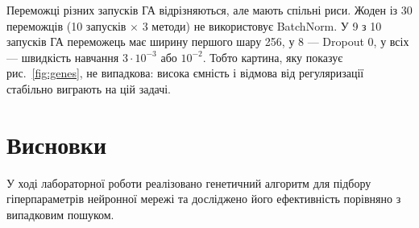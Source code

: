 \documentclass[14pt,a4paper]{extreport}
\begin{document}
Переможці різних запусків ГА відрізняються, але мають спільні риси. Жоден із 30 переможців (10 запусків $\times$ 3 методи) не використовує BatchNorm. У 9 з 10 запусків ГА переможець має ширину першого шару 256, у 8 --- Dropout 0, у всіх --- швидкість навчання $3 \cdot 10^{-3}$ або $10^{-2}$. Тобто картина, яку показує рис.~\ref{fig:genes}, не випадкова: висока ємність і відмова від регуляризації стабільно виграють на цій задачі.

\section{Висновки}

У ході лабораторної роботи реалізовано генетичний алгоритм для підбору гіперпараметрів нейронної мережі та досліджено його ефективність порівняно з випадковим пошуком.
\end{document}

